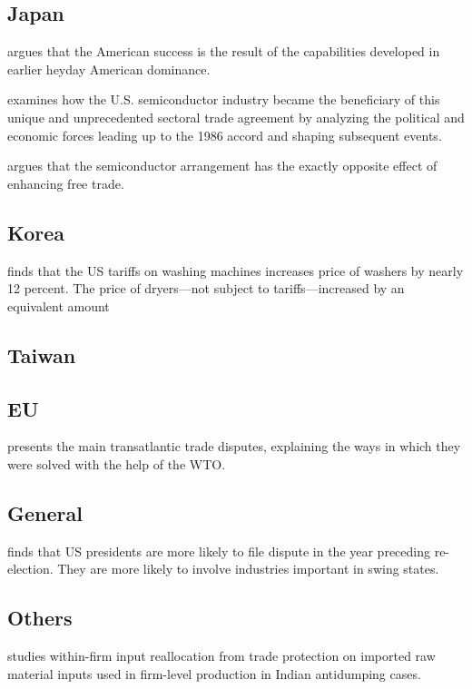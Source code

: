 \documentclass[10pt]{article} %
\begin{document}
    \subsection{Japan}
    \cite{LangloisSteinmueller2000} argues that the American success is the result of the capabilities developed in earlier heyday American dominance.

    \cite{Irwin1994} examines how the U.S. semiconductor industry became the beneficiary of this unique and unprecedented sectoral trade agreement by analyzing the political and economic forces leading up to the 1986 accord and shaping subsequent events.

    \cite{Baldwin1990} argues that the semiconductor arrangement has the exactly opposite effect of enhancing free trade.

    \subsection{Korea}
    \cite{FlaaenHortacsuTintelnot2020} finds that the US tariffs on washing machines increases price of washers by nearly 12 percent. The price of dryers—not subject to tariffs—increased by an equivalent amount

    \subsection{Taiwan}

    \subsection{EU}
    \cite{AndreescuRadu2013} presents the main transatlantic trade disputes, explaining the ways in which they were solved with the help of the WTO.

    \subsection{General}
    \cite{Conconietal2017} finds that US presidents are more likely to file dispute in the year preceding re-election. They are more likely to involve industries important in swing states.
    \subsection{Others}
    \cite{VandenbusscheViegelahn2018} studies within-firm input reallocation from trade protection on imported raw material inputs used in firm-level production in Indian antidumping cases.
\end{document}

